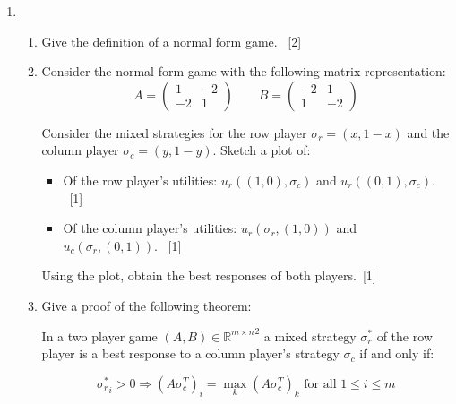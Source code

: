 \documentclass[12pt,a4paper]{article}
\renewcommand{\labelenumi}{\arabic{enumi}} %
\begin{document}
\null \vskip1cm
\begin{enumerate}

\renewcommand\labelenumi{\bfseries\theenumi.}

\item

    \begin{enumerate}
        \item Give the definition of a normal form game.
        ~\hfill{[2]}
        \item Consider the normal form game with
            the following matrix representation:
            $$A=
                \begin{pmatrix}
                    1 & -2\\
                    -2 & 1
                \end{pmatrix}
              \qquad
              B=
                \begin{pmatrix}
                    -2 & 1\\
                    1 & -2
                \end{pmatrix}
            $$

            Consider the mixed strategies for the row player
            \(\sigma_r=(x,1-x)\) and the column player \(\sigma_c=(y,1-y)\).
            Sketch a plot of:

            \begin{itemize}
                \item Of the row player's utilities: \(u_r((1, 0), \sigma_c)\)
                    and \(u_r((0, 1), \sigma_c)\).
                    ~\hfill{[1]}
                \item Of the column player's utilities: \(u_r(\sigma_r, (1, 0))\)
                    and \(u_c(\sigma_r, (0, 1))\).
                    ~\hfill{[1]}
            \end{itemize}

            Using the plot, obtain the best responses of both
            players.~\hfill{[1]}

        \item Give a proof of the following theorem:

              In a two player game $(A,B)\in{\mathbb{R}^{m\times n}}^2$ a mixed
              strategy $\sigma_r^*$  of the row player is a best response to a
              column player's strategy $\sigma_c$ if and only if:

              $${\sigma_r^*}_i > 0 \Rightarrow (A\sigma_c^T)_i =
              \max_{k}(A\sigma_c^T)_k\text{ for all }1\leq i\leq m$$


\end{enumerate}
\end{enumerate}
\end{document}
